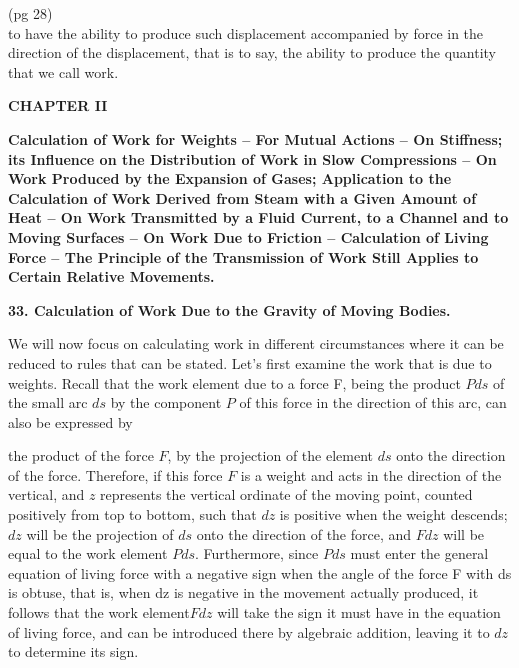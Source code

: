 \documentclass{book}
\begin{document}
\newpage
(pg 28)\\
to have the ability to produce such displacement accompanied by force in the direction of the displacement, that is to say, the ability to produce the quantity that we call work.














\newpage
\begin{center}
\huge\bfseries CHAPTER II
\end{center}
\vspace{10mm} %


\textbf{Calculation of Work for Weights – For Mutual Actions – On Stiffness; its Influence on the Distribution of Work in Slow Compressions – On Work Produced by the Expansion of Gases; Application to the Calculation of Work Derived from Steam with a Given Amount of Heat – On Work Transmitted by a Fluid Current, to a Channel and to Moving Surfaces – On Work Due to Friction – Calculation of Living Force – The Principle of the Transmission of Work Still Applies to Certain Relative Movements.}
\vspace{4mm}

\vspace{4mm}
\textbf{33. Calculation of Work Due to the Gravity of Moving Bodies.}
\vspace{4mm} 


We will now focus on calculating work in different circumstances where it can be reduced to rules that can be stated.
Let's first examine the work that is due to weights.
Recall that the work element due to a force F, being the product \(Pds\) of the small arc \(ds\) by the component \(P\) of this force in the direction of this arc, can also be expressed by 

the product of the force \(F\), by the projection of the element \(ds\) onto the direction of the force. Therefore, if this force \(F\) is a weight and acts in the direction of the vertical, and \(z\) represents the vertical ordinate of the moving point, counted positively from top to bottom, such that \(dz\) is positive when the weight descends; \(dz\) will be the projection of \(ds\) onto the direction of the force, and \(Fdz\) will be equal to the work element 
 \(Pds\). Furthermore, since \(Pds\) must enter the general equation of living force with a negative sign when the angle of the force F with ds is obtuse, that is, when dz is negative in the movement actually produced, it follows that the work element\(Fdz\) will take the sign it must have in the equation of living force, and can be introduced there by algebraic addition, leaving it to \(dz\) to determine its sign.
\end{document}
